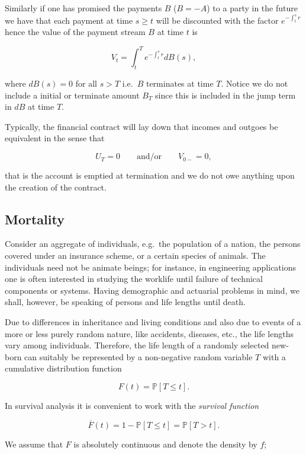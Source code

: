 \documentclass[a4paper,12pt,openany]{book}
\begin{document}
Similarly if one has promised the payments \(B\) (\(B=-A\)) to a party in the future we have that each payment at time \(s\ge t\) will be discounted with the factor \(e^{-\int_t^s r}\) hence the value of the payment stream \(B\) at time \(t\) is

\[
V_t=\int_t^Te^{-\int_t^sr}dB(s),\tag{12}
\]

where \(dB(s)=0\) for all \(s>T\) i.e.~\(B\) terminates at time \(T\). Notice we do not include a initial or terminate amount \(B_T\) since this is included in the jump term in \(dB\) at time \(T\).

Typically, the financial contract will lay down that incomes and outgoes be equivalent in the sense that

\[
U_T =0\qquad \text{and/or}\qquad V_{0-}=0,\tag{13}
\]

that is the account is emptied at termination and we do not owe anything upon the creation of the contract.

\hypertarget{mortality}{%
\subsection{Mortality}\label{mortality}}

Consider an aggregate of individuals, e.g.~the population of a nation, the persons covered under an insurance scheme, or a certain species of animals. The individuals need not be animate beings; for instance, in engineering applications one is often interested in studying the worklife until failure of technical components or systems. Having demographic and actuarial problems in mind, we shall, however, be speaking of persons and life lengths until death.

Due to differences in inheritance and living conditions and also due to events of a more or less purely random nature, like accidents, diseases, etc., the life lengths vary among individuals. Therefore, the life length of a randomly selected new-born can suitably be represented by a non-negative random variable \(T\) with a cumulative distribution function

\[
F(t)=\mathbb P[T\le t].\tag{1}
\]

In survival analysis it is convenient to work with the \emph{survival function}

\[
\overline F(t)=1 -\mathbb P[T\le t]=\mathbb P[T> t].\tag{2}
\]

We assume that \(F\) is absolutely continuous and denote the density by \(f\);
\end{document}

